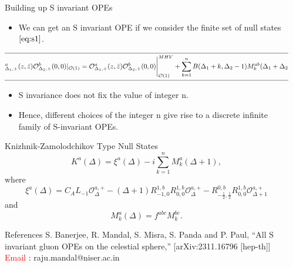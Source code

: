 \documentclass[final]{beamer}
\newlength{\sepwidth}
\newlength{\colwidth}
\newcommand{\separatorcolumn}{\begin{column}{\sepwidth}\end{column}}
\begin{document}
\begin{frame}[t]
\begin{columns}[t]
\begin{column}{\colwidth}
\begin{block}{Building up S invariant OPEs}
\begin{itemize}
			\item[\ding{224}]
			We can get an S invariant OPE if we consider the finite set of null states $\eqref{eq:s1}$.
		\end{itemize}
	    \begin{equation}
	    	\label{eq:s3}
	    	\hspace{-4mm}\boxed{
	    		\begin{split}
	    			&\mathcal{O}^{a}_{\Delta_{1},+}(z,\bar{z})\mathcal{O}^{b}_{\Delta_{2},+}(0,0)|_{\mathcal{O}(1)}
	    			=\mathcal{O}^{a}_{\Delta_{1},+}(z,\bar{z})\mathcal{O}^{b}_{\Delta_{2},+}(0,0)\Bigg|^{MHV}_{\mathcal{O}(1)}+\sum_{k=1}^{n}B(\Delta_{1}+k,\Delta_{2}-1)M^{ab}_{k}(\Delta_{1}+\Delta_{2})
	    	\end{split}}
	    \end{equation}
    \begin{itemize}
    	\item[\ding{224}] S invariance does not fix the value of integer n.
    	\item [\ding{224}] Hence, different choices of the integer n give rise to a discrete infinite family of S-invariant OPEs. 
    \end{itemize}
	\end{block}
 \begin{block}{Knizhnik-Zamolodchikov Type Null States}
\begin{equation}
\label{eq:kz2}
\boxed{
K^{a}(\Delta)=\xi^{a}(\Delta)-i\sum_{k=1}^{n}M^{a}_{k}(\Delta+1)},
\end{equation}
where
\begin{equation}
\label{eq:kz3}
\xi^{a}(\Delta)=C_{A}L_{-1}\mathcal{O}^{a,+}_{\Delta}-(\Delta+1)R^{1,b}_{-1,0}R^{1,b}_{0,0}\mathcal{O}^{a,+}_{\Delta}-R^{0,b}_{-\frac{1}{2},\frac{1}{2}}R^{1,b}_{0,0}\mathcal{O}^{a,+}_{\Delta+1}
\end{equation}
and
\begin{equation}
	M^{a}_{k}(\Delta)=f^{abc}M^{bc}_{k}.
\end{equation}
 \end{block}
\begin{block}{References}
	 S. Banerjee, R. Mandal, S. Misra, S. Panda and P. Paul, “All S invariant gluon OPEs on the
	celestial sphere,” [arXiv:2311.16796 [hep-th]]
	\footnotesize{}
	\vspace{1mm}
	\textcolor{red}{Email} : raju.mandal@niser.ac.in
\end{block}
		\end{column}
	\separatorcolumn
	
\end{columns} 
\end{frame}



	
\end{document}
